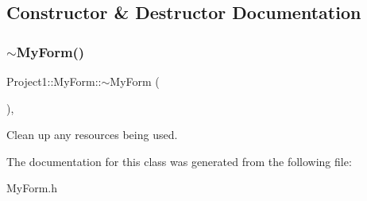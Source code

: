 \subsection{Constructor \& Destructor Documentation}
\mbox{\label{class_project1_1_1_my_form_a501b2b4481b72877fc73101f1d6f26be}} 
\subsubsection{\texorpdfstring{$\sim$\+My\+Form()}{~MyForm()}}
{\footnotesize\ttfamily Project1\+::\+My\+Form\+::$\sim$\+My\+Form (\begin{DoxyParamCaption}{ }\end{DoxyParamCaption})\hspace{0.3cm}{\ttfamily [inline]}, {\ttfamily [protected]}}



Clean up any resources being used. 



The documentation for this class was generated from the following file\+:\begin{DoxyCompactItemize}
\item 
My\+Form.\+h\end{DoxyCompactItemize}
